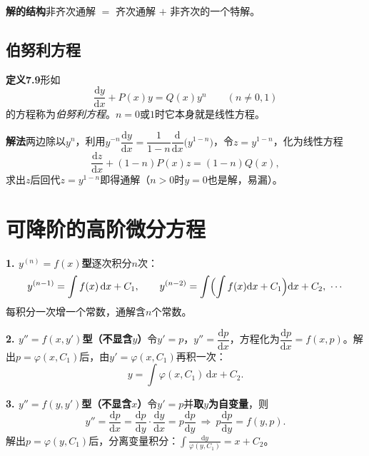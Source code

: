 \noindent\textbf{解的结构}\quad 非齐次通解 $=$ 齐次通解 $+$ 非齐次的一个特解。


\subsection{伯努利方程}

\noindent\textbf{定义7.9}\quad 形如
\[
\frac{\mathrm{d}y}{\mathrm{d}x}+P(x)y=Q(x)y^{n}\qquad(n\neq0,1)
\]
的方程称为\emph{伯努利方程}。$n=0$或$1$时它本身就是线性方程。

\noindent\textbf{解法}\quad 两边除以$y^n$，利用$y^{-n}\dfrac{\mathrm{d}y}{\mathrm{d}x}=\dfrac{1}{1-n}\dfrac{\mathrm{d}}{\mathrm{d}x}\bigl(y^{1-n}\bigr)$，令$z=y^{1-n}$，化为线性方程
\[
\frac{\mathrm{d}z}{\mathrm{d}x}+(1-n)P(x)z=(1-n)Q(x),
\]
求出$z$后回代$z=y^{1-n}$即得通解（$n>0$时$y=0$也是解，易漏）。



\section{可降阶的高阶微分方程}

\noindent\textbf{1. $y^{(n)}=f(x)$型}\quad 逐次积分$n$次：
\[
y^{(n-1)}=\int f(x)\,\mathrm{d}x+C_1,\qquad
y^{(n-2)}=\int\Bigl(\int f(x)\mathrm{d}x+C_1\Bigr)\mathrm{d}x+C_2,\ \cdots
\]
每积分一次增一个常数，通解含$n$个常数。

\noindent\textbf{2. $y''=f(x,y')$型（不显含$y$）}\quad 令$y'=p$，$y''=\dfrac{\mathrm{d}p}{\mathrm{d}x}$，方程化为$\dfrac{\mathrm{d}p}{\mathrm{d}x}=f(x,p)$。解出$p=\varphi(x,C_1)$后，由$y'=\varphi(x,C_1)$再积一次：
\[
y=\int\varphi(x,C_1)\,\mathrm{d}x+C_2 .
\]

\noindent\textbf{3. $y''=f(y,y')$型（不显含$x$）}\quad 令$y'=p$并\textbf{取$y$为自变量}，则
\[
y''=\frac{\mathrm{d}p}{\mathrm{d}x}=\frac{\mathrm{d}p}{\mathrm{d}y}\cdot\frac{\mathrm{d}y}{\mathrm{d}x}=p\frac{\mathrm{d}p}{\mathrm{d}y}
\ \Longrightarrow\ p\frac{\mathrm{d}p}{\mathrm{d}y}=f(y,p).
\]
解出$p=\varphi(y,C_1)$后，分离变量积分：$\displaystyle\int\frac{\mathrm{d}y}{\varphi(y,C_1)}=x+C_2$。

